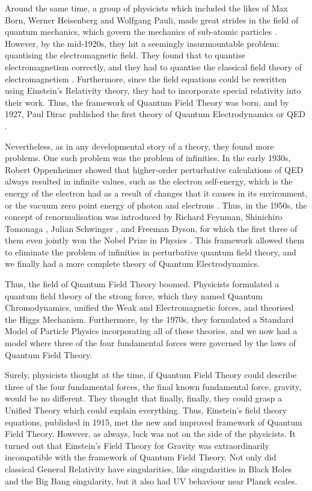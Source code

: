 \documentclass[12pt,a4paper]{report}
\theoremstyle{plain}
\theoremstyle{definition}
\theoremstyle{remark}
\begin{document}
Around the same time, a group of physicists which included the likes of Max Born, Werner Heisenberg and Wolfgang Pauli, made great strides in the field of quantum mechanics, which govern the mechanics of sub-atomic particles \cite{BornQM, BornHeisen}. However, by the mid-1920s, they hit a seemingly insurmountable problem: quantising the electromagnetic field. They found that to quantise electromagnetism correctly, and they had to quantise the classical field theory of electromagnetism \cite{PauliQE}. Furthermore, since the field equations could be rewritten using Einstein's Relativity theory, they had to incorporate special relativity into their work. Thus, the framework of Quantum Field Theory was born, and by 1927, Paul Dirac published the first theory of Quantum Electrodynamics or QED \cite{DiracFirstQED}. 

Nevertheless, as in any developmental story of a theory, they found more problems. One such problem was the problem of infinities. In the early 1930s, Robert Oppenheimer showed that higher-order perturbative calculations of QED always resulted in infinite values, such as the electron self-energy, which is the energy of the electron had as a result of changes that it causes in its environment, or the vacuum zero point energy of photon and electrons \cite{Oppie}. Thus, in the 1950s, the concept of renormalisation was introduced by Richard Feynman, Shinichiro Tomonaga \cite{Tomonaga1948OnIF, Fukuda1948ASS}, Julian Schwinger \cite{PhysRev.74.1439}, and Freeman Dyson, for which the first three of them even jointly won the Nobel Prize in Physics \cite{Schweber1994QEDAT}. This framework allowed them to eliminate the problem of infinities in perturbative quantum field theory, and we finally had a more complete theory of Quantum Electrodynamics. 

Thus, the field of Quantum Field Theory boomed. Physicists formulated a quantum field theory of the strong force, which they named Quantum Chromodynamics, unified the Weak and Electromagnetic forces, and theorised the Higgs Mechanism. Furthermore, by the 1970s, they formulated a Standard Model of Particle Physics incorporating all of these theories, and we now had a model where three of the four fundamental forces were governed by the laws of Quantum Field Theory.

Surely, physicists thought at the time, if Quantum Field Theory could describe three of the four fundamental forces, the final known fundamental force, gravity, would be no different. They thought that finally, finally, they could grasp a Unified Theory which could explain everything. Thus, Einstein's field theory equations, published in 1915, met the new and improved framework of Quantum Field Theory. However, as always, luck was not on the side of the physicists. It turned out that Einstein's Field Theory for Gravity was extraordinarily incompatible with the framework of Quantum Field Theory. Not only did classical General Relativity have singularities, like singularities in Black Holes and the Big Bang singularity, but it also had UV behaviour near Planck scales. 
\end{document}
